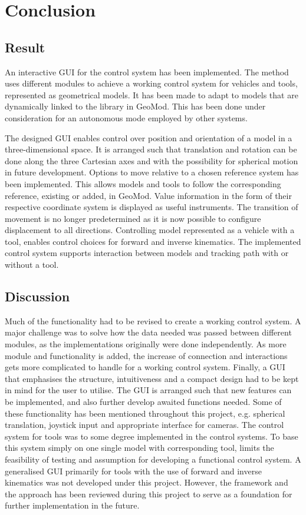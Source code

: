 \chapter{Conclusion}

\section{Result}
An interactive GUI for the control system has been implemented. The method uses different modules to achieve a working control system for vehicles and tools, represented as geometrical models. It has been made to adapt to models that are dynamically linked to the library in GeoMod. This has been done under consideration for an autonomous mode employed by other systems. 

The designed GUI enables control over position and orientation of a model in a three-dimensional space. It is arranged such that translation and rotation can be done along the three Cartesian axes and with the possibility for spherical motion in future development. Options to move relative to a chosen reference system has been implemented. This allows models and tools to follow the corresponding reference, existing or added, in GeoMod. Value information in the form of their respective coordinate system is displayed as useful instruments. The transition of movement is no longer predetermined as it is now possible to configure displacement to all directions. Controlling model represented as a vehicle with a tool, enables control choices for forward and inverse kinematics. The implemented control system supports interaction between models and tracking path with or without a tool.

\section{Discussion}

Much of the functionality had to be revised to create a working control system. A major challenge was to solve how the data needed was passed between different modules, as the implementations originally were done independently. As more module and functionality is added, the increase of connection and interactions gets more complicated to handle for a working control system. Finally, a GUI that emphasises the structure, intuitiveness and a compact design had to be kept in mind for the user to utilise. The GUI is arranged such that new features can be implemented, and also further develop awaited functions needed. Some of these functionality has been mentioned throughout this project, e.g. spherical translation, joystick input and appropriate interface for cameras. The control system for tools was to some degree implemented in the control systems. To base this system simply on one single model with corresponding tool, limits the feasibility of testing and assumption for developing a functional control system. A generalised GUI primarily for tools with the use of forward and inverse kinematics was not developed under this project. However, the framework and the approach has been reviewed during this project to serve as a foundation for further implementation in the future.

